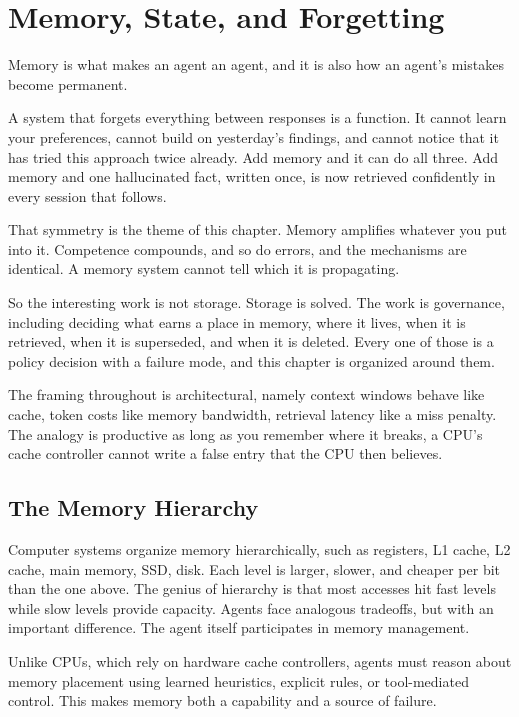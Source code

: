 \chapter{Memory, State, and Forgetting}
\label{ch:memory}

Memory is what makes an agent an agent, and it is also how an agent's mistakes
become permanent.

A system that forgets everything between responses is a function. It cannot learn
your preferences, cannot build on yesterday's findings, and cannot notice that it
has tried this approach twice already. Add memory and it can do all three. Add
memory and one hallucinated fact, written once, is now retrieved confidently in
every session that follows.

That symmetry is the theme of this chapter. Memory amplifies whatever you put into
it. Competence compounds, and so do errors, and the mechanisms are identical. A
memory system cannot tell which it is propagating.

So the interesting work is not storage. Storage is solved. The work is
governance, including deciding what earns a place in memory, where it lives, when it is
retrieved, when it is superseded, and when it is deleted. Every one of those is a
policy decision with a failure mode, and this chapter is organized around them.

The framing throughout is architectural, namely context windows behave like cache, token
costs like memory bandwidth, retrieval latency like a miss penalty. The analogy is
productive as long as you remember where it breaks, a CPU's cache controller
cannot write a false entry that the CPU then believes.

\section{The Memory Hierarchy}

Computer systems organize memory hierarchically, such as registers, L1 cache, L2 cache, main memory, SSD, disk. Each level is larger, slower, and cheaper per bit than the one above. The genius of hierarchy is that most accesses hit fast levels while slow levels provide capacity. Agents face analogous tradeoffs, but with an important difference. The agent itself participates in memory management.

Unlike CPUs, which rely on hardware cache controllers, agents must reason about memory placement using learned heuristics, explicit rules, or tool-mediated control. This makes memory both a capability and a source of failure.

